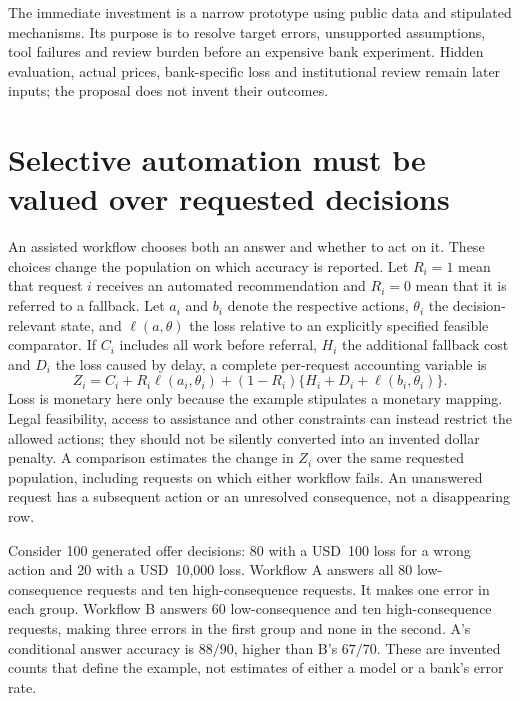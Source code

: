 The immediate investment is a narrow prototype using public data and
stipulated mechanisms. Its purpose is to resolve target errors,
unsupported assumptions, tool failures and review burden before an
expensive bank experiment. Hidden evaluation, actual prices,
bank-specific loss and institutional review remain later inputs; the
proposal does not invent their outcomes.

\label{exec14:cost-development-end}


\section{Selective automation must be valued over requested decisions}
\label{exec14:l8-development}

An assisted workflow chooses both an answer and whether to act on it. These
choices change the population on which accuracy is reported. Let $R_i=1$ mean
that request $i$ receives an automated recommendation and $R_i=0$ mean that it
is referred to a fallback. Let $a_i$ and $b_i$ denote the respective actions,
$\theta_i$ the decision-relevant state, and $\ell(a,\theta)$ the loss relative
to an explicitly specified feasible comparator. If $C_i$ includes all work
before referral, $H_i$ the additional fallback cost and $D_i$ the loss caused
by delay, a complete per-request accounting variable is
\[
 Z_i=C_i+R_i\ell(a_i,\theta_i)
       +(1-R_i)\{H_i+D_i+\ell(b_i,\theta_i)\}.
\]
Loss is monetary here only because the example stipulates a monetary mapping.
Legal feasibility, access to assistance and other constraints can instead
restrict the allowed actions; they should not be silently converted into an
invented dollar penalty. A comparison estimates the change in $Z_i$ over the
same requested population, including requests on which either workflow fails.
An unanswered request has a subsequent action or an unresolved consequence,
not a disappearing row. \citep{exec14_l8_economics}

Consider 100 generated offer decisions: 80 with a USD~100 loss for a wrong
action and 20 with a USD~10,000 loss. Workflow A answers all 80 low-consequence
requests and ten high-consequence requests. It makes one error in each group.
Workflow B answers 60 low-consequence and ten high-consequence requests, making
three errors in the first group and none in the second. A's conditional answer
accuracy is $88/90$, higher than B's $67/70$. These are invented counts that
define the example, not estimates of either a model or a bank's error rate.

